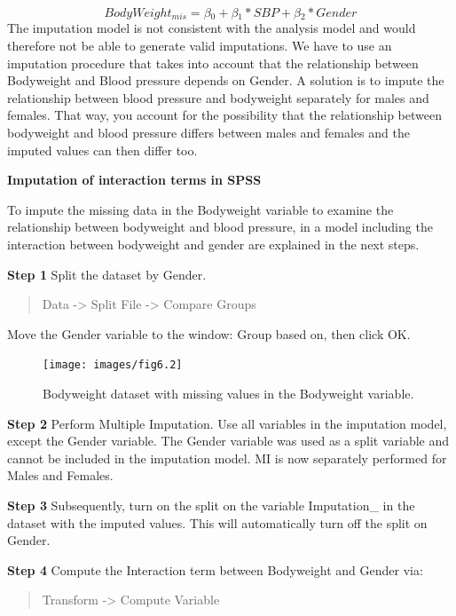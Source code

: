 \documentclass[
]{book}
\begin{document}
\[BodyWeight{_{mis}} = β{_0} + β{_1} * SBP + β{_2} * Gender\]
The imputation model is not consistent with the analysis model and would therefore not be able to generate valid imputations. We have to use an imputation procedure that takes into account that the relationship between Bodyweight and Blood pressure depends on Gender. A solution is to impute the relationship between blood pressure and bodyweight separately for males and females. That way, you account for the possibility that the relationship between bodyweight and blood pressure differs between males and females and the imputed values can then differ too.

\textbf{Imputation of interaction terms in SPSS}

To impute the missing data in the Bodyweight variable to examine the relationship between bodyweight and blood pressure, in a model including the interaction between bodyweight and gender are explained in the next steps.

\textbf{Step 1}
Split the dataset by Gender.

\begin{quote}
Data -\textgreater{} Split File -\textgreater{} Compare Groups
\end{quote}

Move the Gender variable to the window: Group based on, then click OK.

\begin{figure}

{\centering \texttt{[image: images/fig6.2]} 

}

\caption{Bodyweight dataset with missing values in the Bodyweight variable.}\label{fig:fig6-2}
\end{figure}

\textbf{Step 2}
Perform Multiple Imputation. Use all variables in the imputation model, except the Gender variable. The Gender variable was used as a split variable and cannot be included in the imputation model. MI is now separately performed for Males and Females.

\textbf{Step 3}
Subsequently, turn on the split on the variable Imputation\_ in the dataset with the imputed values. This will automatically turn off the split on Gender.

\textbf{Step 4}
Compute the Interaction term between Bodyweight and Gender via:

\begin{quote}
Transform -\textgreater{} Compute Variable
\end{quote}
\end{document}
